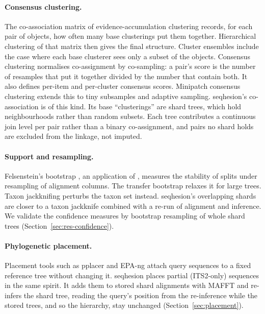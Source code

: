 \documentclass[11pt,a4paper]{article}
\newcommand{\seqhesion}{\textsf{seqhesion}}
\begin{document}
\paragraph{Consensus clustering.}
The co-association matrix of evidence-accumulation clustering \citep{fred2005evidence} records, for
each pair of objects, how often many base clusterings put them together. Hierarchical clustering of
that matrix then gives the final structure. Cluster ensembles \citep{strehl2002ensembles} include the
case where each base clusterer sees only a subset of the objects. Consensus clustering
\citep{monti2003consensus} normalises co-assignment by co-sampling: a pair's score is the number of
resamples that put it together divided by the number that contain both. It also defines per-item
and per-cluster consensus scores. Minipatch consensus clustering \citep{gan2022impacc} extends this
to tiny subsamples and adaptive sampling. \seqhesion's co-association is of this kind. Its base
``clusterings'' are shard trees, which hold neighbourhoods rather than random subsets. Each tree
contributes a continuous join level per pair rather than a binary co-assignment, and pairs no shard
holds are excluded from the linkage, not imputed.

\paragraph{Support and resampling.}
Felsenstein's bootstrap \citep{felsenstein1985bootstrap}, an application of
\citet{efron1979bootstrap}, measures the stability of splits under resampling of alignment
columns. The transfer bootstrap \citep{lemoine2018tbe} relaxes it for large trees. Taxon jackknifing
\citep{lanyon1985jackknife} perturbs the taxon set instead. \seqhesion's overlapping shards are
closer to a taxon jackknife combined with a re-run of alignment and inference. We validate the
confidence measures by bootstrap resampling of whole shard trees (Section~\ref{sec:res-confidence}).

\paragraph{Phylogenetic placement.}
Placement tools such as pplacer \citep{matsen2010pplacer} and EPA-ng \citep{barbera2019epang} attach
query sequences to a fixed reference tree without changing it. \seqhesion{} places partial
(ITS2-only) sequences in the same spirit. It adds them to stored shard alignments with MAFFT
\citep{katoh2012add} and re-infers the shard tree, reading the query's position from the
re-inference while the stored trees, and so the hierarchy, stay unchanged
(Section~\ref{sec:placement}).
\end{document}
